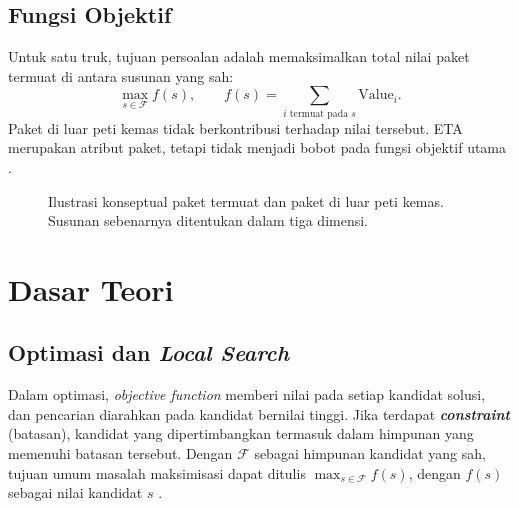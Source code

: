 \documentclass[12pt,a4paper]{article}
\begin{document}
\subsection{Fungsi Objektif}\label{sec:tujuan-persoalan}
Untuk satu truk, tujuan persoalan adalah memaksimalkan total nilai paket termuat di antara susunan yang sah:
\begin{equation}
 \max_{s\in\mathcal{F}} f(s),\qquad f(s)=\sum_{i\text{ termuat pada }s}\mathrm{Value}_i.
 \label{eq:problem-objective}
\end{equation}
Paket di luar peti kemas tidak berkontribusi terhadap nilai tersebut. ETA merupakan atribut paket, tetapi tidak menjadi bobot pada fungsi objektif utama \cite{spesifikasi}.

\begin{figure}[htbp]
    \centering
    \caption{Ilustrasi konseptual paket termuat dan paket di luar peti kemas. Susunan sebenarnya ditentukan dalam tiga dimensi.}
    \label{fig:ilustrasi-pemuatan}
\end{figure}

\clearpage
\section{Dasar Teori}
\subsection{Optimasi dan \textit{Local Search}}
Dalam optimasi, \textit{objective function} memberi nilai pada setiap kandidat solusi, dan pencarian diarahkan pada kandidat bernilai tinggi. Jika terdapat \textbf{\textit{constraint}} (batasan), kandidat yang dipertimbangkan termasuk dalam himpunan yang memenuhi batasan tersebut. Dengan $\mathcal{F}$ sebagai himpunan kandidat yang sah, tujuan umum masalah maksimisasi dapat ditulis $\max_{s\in\mathcal{F}} f(s)$, dengan $f(s)$ sebagai nilai kandidat $s$ \cite{russell-norvig}.
\end{document}
